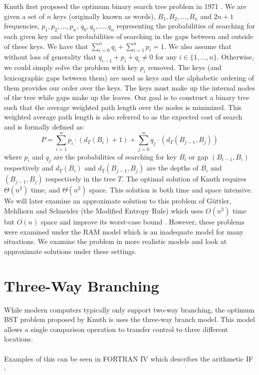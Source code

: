 \documentclass[letterpaper,12pt,titlepage,oneside,final]{book}
\theoremstyle{plain}
\begin{document}
Knuth first proposed the optimum binary search tree problem in 1971 \cite{knuth1971optimum}. We are given a set of $n$ keys (originally known as words), $B_1, B_2, ..., B_n$ and $2n+1$ frequencies, ${p_1, p_2, ..., p_n}$, ${q_0, q_1, ..., q_n}$ representing the probabilities of searching for each given key and the probabilities of searching in the gaps between and outside of these keys. We have that $ \sum\limits_{i=0}^n q_i + \sum\limits_{i=1}^n p_i = 1$. We also assume that without loss of generality that $q_{i-1}+p_i+q_i \neq 0$ for any $i \in \{1,...,n\}$. Otherwise, we could simply solve the problem with key $p_i$ removed. The keys (and lexicographic gaps between them) are used as keys and the alphabetic ordering of them provides our order over the keys. The keys must make up the internal nodes of the tree while gaps make up the leaves. Our goal is to construct a binary tree such that the average weighted path length over the nodes is minimized.  This weighted average path length is also referred to as the expected cost of search and is formally defined as: 
\begin{equation}\label{1.1}
P = \sum_{i=1}^{n} p_i \cdot (d_T(B_i)+1) + \sum_{j=0}^{n} q_j \cdot(d_T(B_{j-1}, B_j))
\end{equation}
where $p_i$ and $q_j$ are the probabilities of searching for key $B_i$ or gap $(B_{i-1}, B_i)$ respectively and $d_T(B_i)$ and $d_T(B_{j-1}, B_j)$ are the depths of $B_i$ and $(B_{j-1}, B_j)$ respectively in the tree $T$. The optimal solution of Knuth requires $\Theta(n^2)$ time, and $\Theta(n^2)$ space. This solution is both time and space intensive. We will later examine an approximate solution to this problem of G{\"u}ttler, Mehlhorn and Schneider (the Modified Entropy Rule) which uses $O(n^2)$ time but $O(n)$ space and improve its worst-case bound \cite{guttler1980binary}. However, these problems were examined under the RAM model which is an inadequate model for many situations. We examine the problem in more realistic models and look at approximate solutions under these settings.

\section{Three-Way Branching}


While modern computers typically only support two-way branching, the optimum BST problem proposed by Knuth is uses the three-way branch model. This model allows a single comparison operation to transfer control to three different locations. \\~\\ Examples of this can be seen in FORTRAN IV which describes the arithmetic IF \cite{Dock:228063}:
\end{document}
